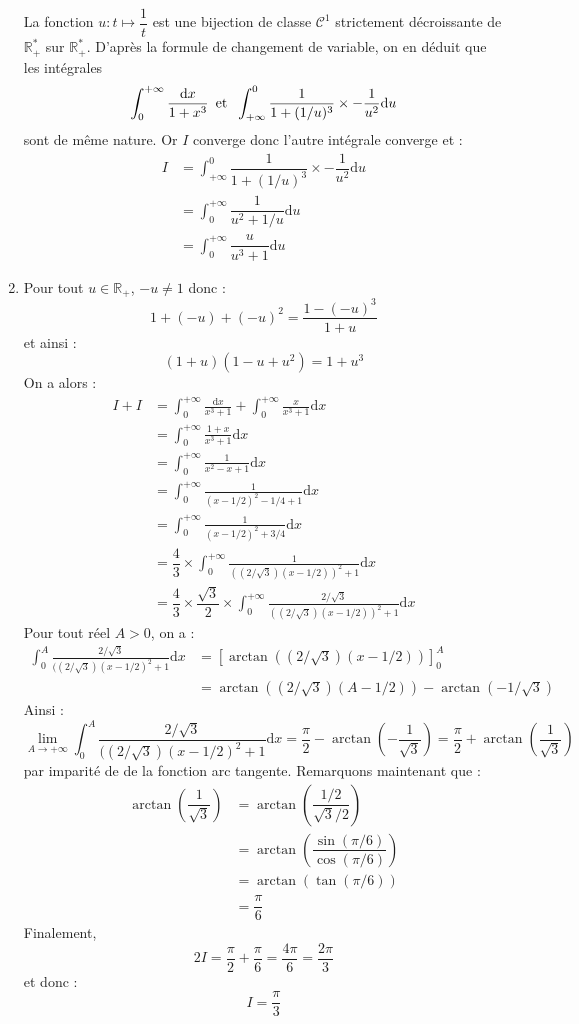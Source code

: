 \documentclass[a4paper,twoside,french,10pt]{VcCours}
\newcommand{\dx}{\text{d}x}
\begin{document}
\begin{enumerate}
\noindent La fonction $u : t \mapsto \dfrac{1}{t}$ est une bijection de classe $\mathcal{C}^1$ strictement décroissante de $\mathbb{R}_+^*$ sur $\mathbb{R}_+^*$. D'après la formule de changement de variable, on en déduit que les intégrales 
$$ \int_0^{+\infty} \dfrac{\dx}{1+x^3} \,\hbox{ et } \;\int_{+\infty}^{0} \dfrac{1}{1+(1/u)^3} \times - \dfrac{1}{u^2} \textrm{d}u$$
sont de même nature. Or $I$ converge donc l'autre intégrale converge et :
\begin{align*}
I & = \int_{+\infty}^{0} \dfrac{1}{1+(1/u)^3} \times - \dfrac{1}{u^2} \textrm{d}u  \\
& = \int_{0}^{+ \infty} \dfrac{1}{u^2+1/u} \textrm{d}u \\
& = \int_{0}^{+ \infty} \dfrac{u}{u^3+1} \textrm{d}u 
\end{align*}
\item Pour tout $u \in \mathbb{R}_+$, $-u \neq 1$ donc :
$$ 1+ (-u)+ (-u)^2 = \dfrac{1-(-u)^3}{1+u}$$
et ainsi :
$$ (1+u)(1-u+u^2) = 1+u^3$$
On a alors :
\begin{align*}
I+I & = \int_{0}^{ + \infty} \frac{\dx}{x^{3} + 1} + \int_{0}^{ + \infty} \frac{x}{x^{3} + 1}\dx\\
& = \int_{0}^{ + \infty} \frac{1+x}{x^{3} + 1} \dx \\
& = \int_{0}^{ + \infty} \frac{1}{x^2-x+1} \dx \\
& = \int_{0}^{ + \infty} \frac{1}{(x-1/2)^2-1/4+1} \dx \\
& = \int_{0}^{ + \infty} \frac{1}{(x-1/2)^2+3/4} \dx \\
& = \dfrac{4}{3} \times  \int_{0}^{ + \infty} \frac{1}{((2/ \sqrt{3})(x-1/2))^2+1} \dx \\
& = \dfrac{4}{3} \times \dfrac{\sqrt{3}}{2} \times \int_{0}^{ + \infty} \frac{2/\sqrt{3}}{((2/ \sqrt{3})(x-1/2))^2+1} \dx 
\end{align*}
Pour tout réel $A >0$, on a :
\begin{align*}
\int_{0}^{A} \frac{2/\sqrt{3}}{((2/ \sqrt{3})(x-1/2)^2+1} \dx & = \left[ \arctan((2/ \sqrt{3})(x-1/2)) \right]_0^A \\
& = \arctan((2/ \sqrt{3})(A-1/2)) - \arctan(- 1/\sqrt{3})
\end{align*}
Ainsi :
$$ \lim_{A \rightarrow + \infty} \int_{0}^{A} \frac{2/\sqrt{3}}{((2/ \sqrt{3})(x-1/2)^2+1} \dx = \dfrac{\pi}{2} - \arctan(- \dfrac{1}{\sqrt{3}}) = \dfrac{\pi}{2} + \arctan(\dfrac{1}{\sqrt{3}})$$
par imparité de de la fonction arc tangente. Remarquons maintenant que :
\begin{align*}
\arctan \left(\dfrac{1}{\sqrt{3}}\right) & = \arctan\left(\dfrac{1/2}{\sqrt{3}/2}\right) \\
& =  \arctan \left(\dfrac{\sin(\pi/6)}{\cos(\pi/6)}\right) \\
& = \arctan\left(\tan(\pi/6)\right) \\
& = \dfrac{\pi}{6}
\end{align*}
Finalement,
$$ 2I = \dfrac{\pi}{2} + \dfrac{\pi}{6} = \dfrac{4\pi}{6} = \dfrac{2\pi}{3}$$
et donc :
$$ I = \dfrac{\pi}{3}$$

\end{enumerate} 
\end{document}
